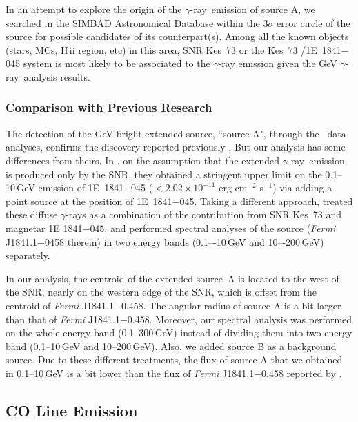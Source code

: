 \documentclass[12pt,preprint]{aastex}
\newcommand{\gray}{{\rm $\gamma$-ray}}
\begin{document}
In an attempt to explore the origin of the \gray\ emission of source A, 
we searched in the SIMBAD Astronomical Database \citep{simbad}
within the $3\sigma$ error circle of the source for 
possible candidates of its counterpart(s). 
Among all the known objects (stars, MCs, H\,{\sc ii} region, etc) in this area, 
SNR Kes~73 or the Kes~73 /1E~1841$-$045  system is most likely
to be associated to the  $\gamma$-ray emission 
given the  GeV \gray\ analysis results. 





\subsubsection{Comparison with Previous Research}

The detection of the GeV-bright extended source, ``source A",
through the \Fermi\ data analyses,
confirms the discovery  reported previously
\citep{1fsnr, Lijian2017magnetar, Yeung2017kes73}.
But our analysis has some  differences from theirs.
In \citet{Lijian2017magnetar}, on the assumption that
 the extended \gray\ emission is produced  only by the SNR,
they obtained a stringent  upper limit on the 0.1--10\,GeV emission 
of 1E~1841$-$045 ($<2.02\times10^{-11}$ erg cm$^{-2}$ s$^{-1}$)
via adding a point source at the position of 1E~1841$-$045.
Taking a different approach, \citet{Yeung2017kes73} treated these diffuse {\gray}s 
as a combination of the contribution from SNR  Kes~73 and magnetar 1E 1841$-$045,
and performed spectral analyses of  the source (\emph{Fermi} J1841.1$-$0458 therein)  
in two energy bands (0.1–-10\,GeV and 10–-200\,GeV) separately.

In our analysis, the centroid of the extended source~A
is located  to the west of the SNR, nearly on the western edge of the SNR,
which is offset from  the centroid of \emph{Fermi} J1841.1$-$0.458.
The angular radius of source A is a bit larger than that of 
\emph{Fermi} J1841.1$-$0.458.
Moreover, our spectral analysis was performed on the whole energy band (0.1--300\,GeV)
instead of  dividing them into two energy band  (0.1--10\,GeV and 10--200\,GeV).
Also, we added source B as a background source.
Due to these different treatments, the flux of source A
 that we obtained  in 0.1--10\,GeV is a bit lower than the flux of  
\emph{Fermi} J1841.1$-$0.458  reported by \citet{Yeung2017kes73}.



\subsection{CO Line Emission}
\label{subec:co}
\end{document}
